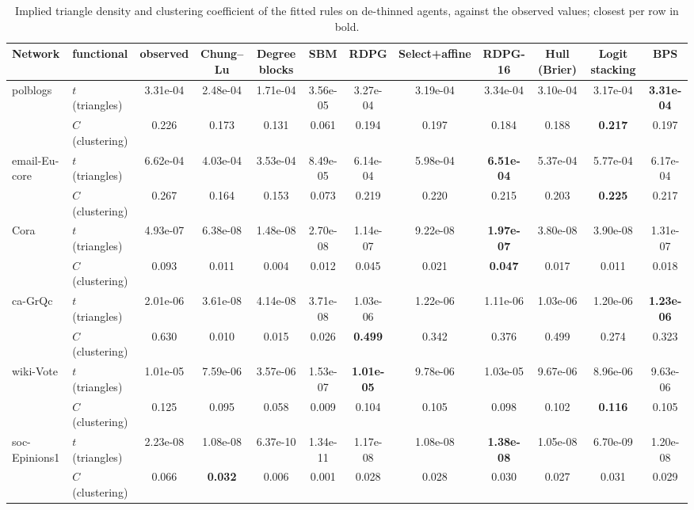 \documentclass[12pt]{article}
\begin{document}
\begin{table}[ht]
\centering
\caption{Implied triangle density and clustering coefficient of the fitted rules on de-thinned agents, against the observed values; closest per row in bold.}
\label{tab:functionals}
\begin{tabular}{llcccccccccc}
\toprule
Network & functional & observed & Chung--Lu & Degree blocks & SBM & RDPG & Select+affine & RDPG-16 & Hull (Brier) & Logit stacking & BPS \\
\midrule
polblogs & $t$ (triangles) & 3.31e-04 & 2.48e-04 & 1.71e-04 & 3.56e-05 & 3.27e-04 & 3.19e-04 & 3.34e-04 & 3.10e-04 & 3.17e-04 & \textbf{3.31e-04} \\
 & $C$ (clustering) & 0.226 & 0.173 & 0.131 & 0.061 & 0.194 & 0.197 & 0.184 & 0.188 & \textbf{0.217} & 0.197 \\
email-Eu-core & $t$ (triangles) & 6.62e-04 & 4.03e-04 & 3.53e-04 & 8.49e-05 & 6.14e-04 & 5.98e-04 & \textbf{6.51e-04} & 5.37e-04 & 5.77e-04 & 6.17e-04 \\
 & $C$ (clustering) & 0.267 & 0.164 & 0.153 & 0.073 & 0.219 & 0.220 & 0.215 & 0.203 & \textbf{0.225} & 0.217 \\
Cora & $t$ (triangles) & 4.93e-07 & 6.38e-08 & 1.48e-08 & 2.70e-08 & 1.14e-07 & 9.22e-08 & \textbf{1.97e-07} & 3.80e-08 & 3.90e-08 & 1.31e-07 \\
 & $C$ (clustering) & 0.093 & 0.011 & 0.004 & 0.012 & 0.045 & 0.021 & \textbf{0.047} & 0.017 & 0.011 & 0.018 \\
ca-GrQc & $t$ (triangles) & 2.01e-06 & 3.61e-08 & 4.14e-08 & 3.71e-08 & 1.03e-06 & 1.22e-06 & 1.11e-06 & 1.03e-06 & 1.20e-06 & \textbf{1.23e-06} \\
 & $C$ (clustering) & 0.630 & 0.010 & 0.015 & 0.026 & \textbf{0.499} & 0.342 & 0.376 & 0.499 & 0.274 & 0.323 \\
wiki-Vote & $t$ (triangles) & 1.01e-05 & 7.59e-06 & 3.57e-06 & 1.53e-07 & \textbf{1.01e-05} & 9.78e-06 & 1.03e-05 & 9.67e-06 & 8.96e-06 & 9.63e-06 \\
 & $C$ (clustering) & 0.125 & 0.095 & 0.058 & 0.009 & 0.104 & 0.105 & 0.098 & 0.102 & \textbf{0.116} & 0.105 \\
soc-Epinions1 & $t$ (triangles) & 2.23e-08 & 1.08e-08 & 6.37e-10 & 1.34e-11 & 1.17e-08 & 1.08e-08 & \textbf{1.38e-08} & 1.05e-08 & 6.70e-09 & 1.20e-08 \\
 & $C$ (clustering) & 0.066 & \textbf{0.032} & 0.006 & 0.001 & 0.028 & 0.028 & 0.030 & 0.027 & 0.031 & 0.029 \\
\bottomrule
\end{tabular}

\end{table}
\end{document}
